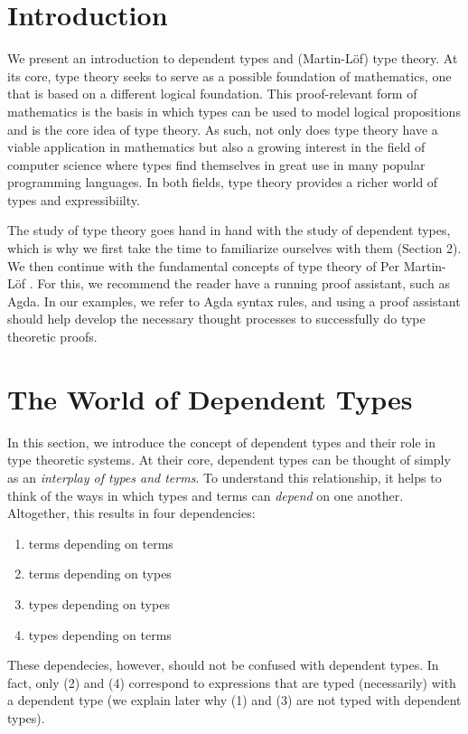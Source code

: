 \documentclass[12pt]{article}
\begin{document}
\maketitle


\section{Introduction}
We present an introduction to dependent types and (Martin-L\"of) type theory.
At its core, type theory seeks to serve as a possible foundation of mathematics,
one that is based on a different logical foundation. This proof-relevant
form of mathematics is the basis in which types can be used to model logical
propositions and is the core idea of type theory. As such, not only does type
theory have a viable application in mathematics but also a growing interest
in the field of computer science where types find themselves in great use in
many popular programming languages. In both fields, type theory provides a
richer world of types and expressibiilty.

The study of type theory goes hand in hand with the study of dependent types,
which is why we first take the time to familiarize ourselves with them
(Section 2). We then continue with the fundamental concepts of type theory of
Per Martin-L\"of \cite{}. For this, we recommend the reader have a running proof
assistant, such as Agda. In our examples, we refer to Agda syntax rules, and
using a proof assistant should help develop the necessary thought processes to
successfully do type theoretic proofs. 

\section{The World of Dependent Types}
In this section, we introduce the concept of dependent types and their role in
type theoretic systems. At their core, dependent types can be thought of simply
as an \textit{interplay of types and terms}. To understand this relationship,
it helps to think of the ways in which types and terms can \textit{depend} on
one another. Altogether, this results in four dependencies:

\begin{enumerate}
\item terms depending on terms
\item terms depending on types
\item types depending on types
\item types depending on terms
\end{enumerate}
These dependecies, however, should not be confused with dependent types.
In fact, only (2) and (4) correspond to expressions that are typed (necessarily)
with a dependent type (we explain later why (1) and (3) are not typed with
dependent types).
\end{document}
